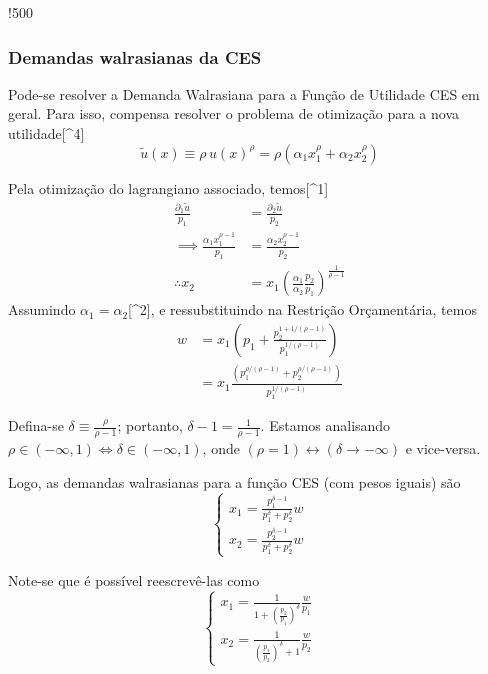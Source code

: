 \documentclass[12pt]{article}
\numberwithin{equation}{section}
\theoremstyle{plain}
\theoremstyle{definition}
\theoremstyle{remark}
\begin{document}
!500

\hypertarget{demandas-walrasianas-da-ces}{%
\subsubsection{Demandas walrasianas da
CES}\label{demandas-walrasianas-da-ces}}

Pode-se resolver a Demanda Walrasiana para a Função de Utilidade CES em
geral. Para isso, compensa resolver o problema de otimização para a nova
utilidade{[}\^{}4{]} \[
\tilde{u}(x) \equiv \rho \, u(x)^\rho = \rho (\alpha_{1} x_{1}^\rho + \alpha_{2} x_{2}^\rho)
\]

Pela otimização do lagrangiano associado, temos{[}\^{}1{]} \[
\begin{align*}
\frac{\partial_{1}\tilde{u}}{p_{1}} &= \frac{\partial_{2}\tilde{u}}{p_{2}} \\
\implies \frac{\alpha_{1} x_{1}^{\rho-1}}{p_{1}} &= \frac{\alpha_{2} x_{2}^{\rho -1}}{p_{2}} \\
\therefore x_{2} &= x_{1} \left( \frac{\alpha_{1}}{\alpha_{2}} \frac{p_{2}}{p_{1}} \right)^{\frac{1}{\rho-1}}
\end{align*}
\] Assumindo \(\alpha_{1} = \alpha_{2}\){[}\^{}2{]}, e ressubstituindo
na Restrição Orçamentária, temos \[
\begin{align*}
w &= x_{1}\left( p_{1} + \frac{p_{2}^{1 + 1/(\rho-1)}}{p_{1}^{1/(\rho-1)}} \right) \\
&= x_{1} \frac{(p_{1}^{\rho/(\rho-1)} + p_{2}^{\rho/(\rho-1)})}{p_{1}^{1/(\rho-1)}}
\end{align*}
\]

Defina-se \(\delta \equiv \frac{\rho}{\rho-1}\); portanto,
\(\delta-1 = \frac{1}{\rho-1}\). Estamos analisando
\(\rho \in (-\infty, 1) \iff \delta \in (-\infty, 1)\), onde
\((\rho=1) \leftrightarrow (\delta \to -\infty)\) e vice-versa.

Logo, as demandas walrasianas para a função CES (com pesos iguais) são
\[
\begin{cases}
x_{1} = \frac{p_{1}^{\delta-1}}{p_{1}^\delta + p_{2}^\delta} w \\
x_{2} = \frac{p_{2}^{\delta-1}}{p_{1}^\delta + p_{2}^\delta} w
\end{cases}
\]

Note-se que é possível reescrevê-las como \[
\begin{cases}
x_{1} = \frac{1}{1 + \left( \frac{p_{2}}{p_{1}} \right)^\delta} \frac{w}{p_{1}} \\
x_{2} = \frac{1}{\left( \frac{p_{1}}{p_{2}} \right)^\delta + 1} \frac{w}{p_{2}}
\end{cases}
\]
\end{document}
